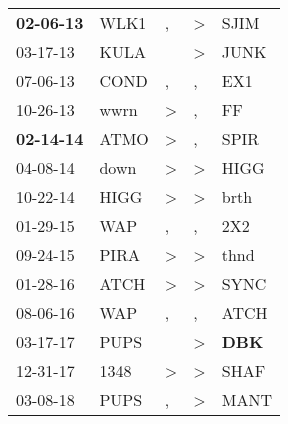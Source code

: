 \begin{supertabular}{p{0.07\textwidth}p{0.06\textwidth}p{0.02\textwidth}p{0.02\textwidth}p{0.06\textwidth}}
 \textbf{02-06-13\textsuperscript{}} &           WLK1\textsuperscript{} &                , &     \textgreater &           SJIM\textsuperscript{} \\
          03-17-13\textsuperscript{} &           KULA\textsuperscript{} &                  &     \textgreater &           JUNK\textsuperscript{} \\
          07-06-13\textsuperscript{} &           COND\textsuperscript{} &                , &                , &            EX1\textsuperscript{} \\
          10-26-13\textsuperscript{} &           wwrn\textsuperscript{} &     \textgreater &                , &             FF\textsuperscript{} \\
 \textbf{02-14-14\textsuperscript{}} &           ATMO\textsuperscript{} &     \textgreater &                , &           SPIR\textsuperscript{} \\
          04-08-14\textsuperscript{} &           down\textsuperscript{} &     \textgreater &     \textgreater &           HIGG\textsuperscript{} \\
          10-22-14\textsuperscript{} &           HIGG\textsuperscript{} &     \textgreater &     \textgreater &           brth\textsuperscript{} \\
          01-29-15\textsuperscript{} &            WAP\textsuperscript{} &                , &                , &            2X2\textsuperscript{} \\
          09-24-15\textsuperscript{} &           PIRA\textsuperscript{} &     \textgreater &     \textgreater &           thnd\textsuperscript{} \\
          01-28-16\textsuperscript{} &           ATCH\textsuperscript{} &     \textgreater &     \textgreater &           SYNC\textsuperscript{} \\
          08-06-16\textsuperscript{} &            WAP\textsuperscript{} &                , &                , &           ATCH\textsuperscript{} \\
          03-17-17\textsuperscript{} &           PUPS\textsuperscript{} &                  &     \textgreater &   \textbf{DBK\textsuperscript{}} \\
          12-31-17\textsuperscript{} &           1348\textsuperscript{} &     \textgreater &     \textgreater &           SHAF\textsuperscript{} \\
          03-08-18\textsuperscript{} &           PUPS\textsuperscript{} &                , &     \textgreater &           MANT\textsuperscript{} \\

\end{supertabular}
